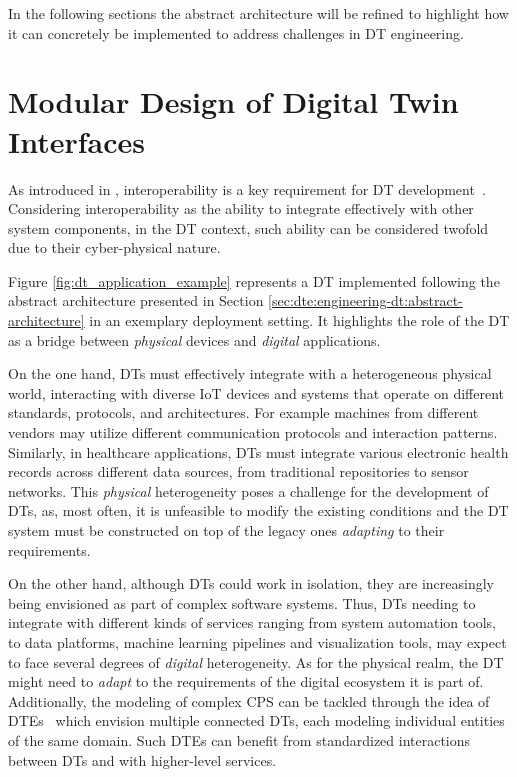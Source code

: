 In the following sections the abstract architecture will be refined to highlight how it can concretely be implemented to address challenges in \ac{DT} engineering.


\section{Modular Design of Digital Twin Interfaces}
\label{sec:dte:engineering-dt:physical-digital-adapters}

As introduced in , interoperability is a key requirement for \ac{DT} development~\cite{Acharya_Khan_Päivärinta_2024,Klar_Arvidsson_Angelakis_2024}.
%
Considering interoperability as the ability to integrate effectively with other system components,
in the \ac{DT} context, such ability can be considered twofold due to their cyber-physical nature.

Figure \ref{fig:dt_application_example} represents a \ac{DT} implemented following the abstract architecture presented in Section \ref{sec:dte:engineering-dt:abstract-architecture} in an exemplary deployment setting.
%
It highlights the role of the \ac{DT} as a bridge between \emph{physical} devices and \emph{digital} applications.

On the one hand, \acp{DT} must effectively integrate with a heterogeneous physical world, interacting with diverse \ac{IoT} devices and systems that operate on different standards, protocols, and architectures.
%
For example machines from different vendors may utilize different communication protocols and interaction patterns.
%
Similarly, in healthcare applications, \acp{DT} must integrate various electronic health records across different data sources, from traditional repositories to sensor networks.
%
This \emph{physical} heterogeneity poses a challenge for the development of \acp{DT}, as, most often, it is unfeasible to modify the existing conditions and the \ac{DT} system must be constructed on top of the legacy ones \emph{adapting} to their requirements.

On the other hand, although \acp{DT} could work in isolation, they are increasingly being envisioned as part of complex software systems.
%
Thus, \acp{DT} needing to integrate with different kinds of services ranging from system automation tools, to data platforms, machine learning pipelines and visualization tools, may expect to face several degrees of \emph{digital} heterogeneity.
%
As for the physical realm, the \ac{DT} might need to \emph{adapt} to the requirements of the digital ecosystem it is part of.
%
Additionally, the modeling of complex \ac{CPS} can be tackled through the idea of \acp{DTE}~\cite{web-of-dt-ricci-2022} which envision multiple connected \acp{DT}, each modeling individual entities of the same domain. 
Such \acp{DTE} can benefit from standardized interactions between \acp{DT} and with higher-level services.

